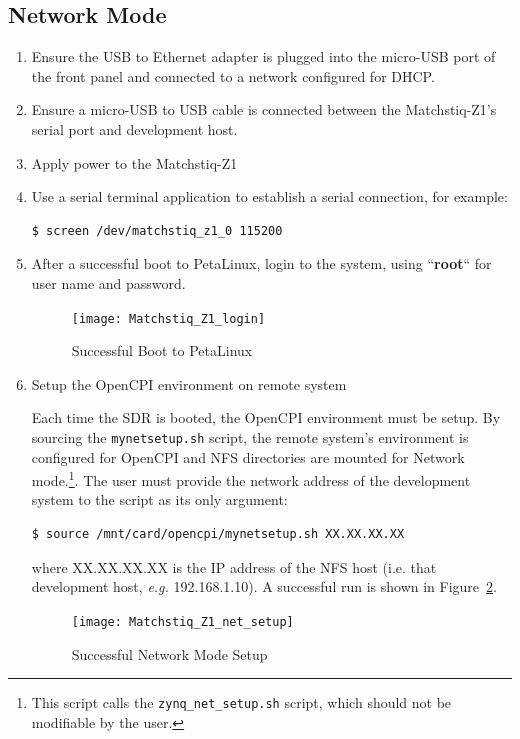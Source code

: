 \subsection{Network Mode}
\begin{enumerate}
\item Ensure the USB to Ethernet adapter is plugged into the micro-USB port of the front panel and connected to a network configured for DHCP.
\item Ensure a micro-USB to USB cable is connected between the Matchstiq-Z1's serial port and development host.
\item Apply power to the Matchstiq-Z1
\item Use a serial terminal application to establish a serial connection, for example:
\begin{verbatim}
$ screen /dev/matchstiq_z1_0 115200
\end{verbatim} \medskip

\item After a successful boot to PetaLinux, login to the system, using  ``\textbf{root}`` for user name and password.

\begin{figure}[H]
	\centerline{\texttt{[image: Matchstiq\_Z1\_login]}}
	\caption{Successful Boot to PetaLinux}
	\label{fig:boot1}
\end{figure}

\item Setup the OpenCPI environment on remote system

\begin{flushleft}
Each time the SDR is booted, the OpenCPI environment must be setup. By sourcing the \texttt{mynetsetup.sh} script, the remote system's environment is configured for OpenCPI and NFS directories are mounted for Network mode.\footnote{This script calls the \texttt{zynq\_net\_setup.sh} script, which should not be modifiable by the user.}. The user must provide the network address of the development system to the script as its only argument:
\begin{verbatim}
$ source /mnt/card/opencpi/mynetsetup.sh XX.XX.XX.XX
\end{verbatim} \medskip

where XX.XX.XX.XX is the IP address of the NFS host (i.e. that development host, \textit{e.g.} 192.168.1.10). A successful run is shown in Figure~\ref{fig:netsetup}.
\end{flushleft}

\begin{figure}[H]
	\centerline{\texttt{[image: Matchstiq\_Z1\_net\_setup]}}
	\caption{Successful Network Mode Setup}
	\label{fig:netsetup}
\end{figure} \medskip



\end{enumerate}

